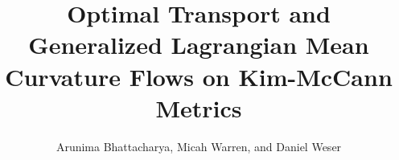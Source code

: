 \documentclass[12pt,letterpaper]{amsart}%
\numberwithin{mycounter}{section}
\theoremstyle{plain}
\numberwithin{equation}{section}
\theoremstyle{definition}
\newcommand{\note}[1]{\strut{\color{red}[#1]}}
\begin{document}
\title[Optimal Transport and Flows on KM metrics ]{Optimal Transport and Generalized Lagrangian Mean Curvature Flows on Kim-McCann Metrics}

\author{Arunima Bhattacharya, Micah Warren, and Daniel Weser}

\address{Department of Mathematics, Phillips Hall\\
 The University of North Carolina at Chapel Hill, NC }

\address{Department of Mathematics\\
	University of Oregon, Eugene, OR 97403}

\address{Department of Mathematics, Phillips Hall\\
 The University of North Carolina at Chapel Hill, NC }
\end{document}
